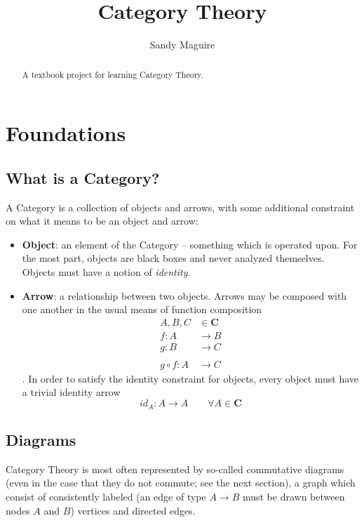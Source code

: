 \documentclass[]{article}
\title{Category Theory}
\author{Sandy Maguire}
\newcommand{\cat}[1]{\mathbf{#1}}
\begin{document}
\maketitle

\begin{abstract}
A textbook project for learning Category Theory.
\end{abstract}

\newpage

\section{Foundations}

\subsection{What is a Category?}

A Category is a collection of objects and arrows, with some additional constraint on what it means to be an object and
arrow:

\begin{itemize}
\item \textbf{Object}: an element of the Category -- something which is operated upon. For the most part, objects are
    black boxes and never analyzed themselves. Objects must have a notion of \textit{identity}.
\item \textbf{Arrow}: a relationship between two objects. Arrows may be composed with one another in the usual means of
    function composition
\begin{align*}
A, B, C &\in \cat{C} \\
f: A &\to B \\
g: B &\to C \\
\\
g \circ f: A &\to C
\end{align*}
. In order to satisfy the identity constraint for objects, every object must have a trivial identity arrow
$$id_A: A \to A \qquad \forall A \in \cat{C}$$
\end{itemize}

\subsection{Diagrams}

Category Theory is most often represented by so-called commutative diagrams (even in the case that they do not commute;
see the next section), a graph which consist of consistently labeled (an edge of type $A \to B$ must be drawn between
nodes $A$ and $B$) vertices and directed edges.
\end{document}
